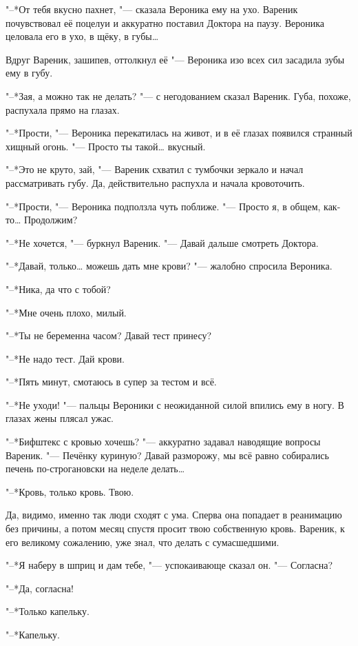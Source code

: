 "--*От тебя вкусно пахнет, "--- сказала Вероника ему на ухо.
Вареник почувствовал её поцелуи и аккуратно поставил Доктора на паузу.
Вероника целовала его в ухо, в щёку, в губы\ldots{}

Вдруг Вареник, зашипев, оттолкнул её "--- Вероника изо всех сил засадила зубы ему в губу.

"--*Зая, а можно так не делать? "--- с негодованием сказал Вареник.
Губа, похоже, распухала прямо на глазах.

"--*Прости, "--- Вероника перекатилась на живот, и в её глазах появился странный хищный огонь.
"--- Просто ты такой\ldots{} вкусный.

"--*Это не круто, зай, "--- Вареник схватил с тумбочки зеркало и начал рассматривать губу.
Да, действительно распухла и начала кровоточить.

"--*Прости, "--- Вероника подползла чуть поближе.
"--- Просто я, в общем, как-то\ldots{}
Продолжим?

"--*Не хочется, "--- буркнул Вареник.
"--- Давай дальше смотреть Доктора.

"--*Давай, только\ldots{} можешь дать мне крови? "--- жалобно спросила Вероника.

"--*Ника, да что с тобой?

"--*Мне очень плохо, милый.

"--*Ты не беременна часом?
Давай тест принесу?

"--*Не надо тест.
Дай крови.

"--*Пять минут, смотаюсь в супер за тестом и всё.

"--*Не уходи! "--- пальцы Вероники с неожиданной силой впились ему в ногу.
В глазах жены плясал ужас.

"--*Бифштекс с кровью хочешь? "--- аккуратно задавал наводящие вопросы Вареник.
"--- Печёнку куриную?
Давай разморожу, мы всё равно собирались печень по-строгановски на неделе делать\ldots{}

"--*Кровь, только кровь.
Твою.

Да, видимо, именно так люди сходят с ума.
Сперва она попадает в реанимацию без причины, а потом месяц спустя просит твою собственную кровь.
Вареник, к его великому сожалению, уже знал, что делать с сумасшедшими.

"--*Я наберу в шприц и дам тебе, "--- успокаивающе сказал он.
"--- Согласна?

"--*Да, согласна!

"--*Только капельку.

"--*Капельку.

